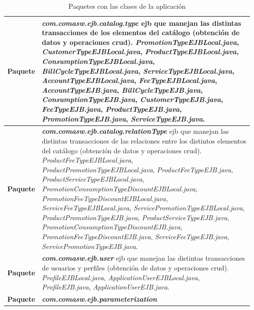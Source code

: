 \begin{longtable}{m{1cm} m{11cm}}
    \caption{Paquetes con las clases de la aplicación}
    \label{tab:paquetes}\\
    \rowcolors{2}{white}{white}
    \textbf{Paquete} & \textit{\textbf{com.comasw.ejb.catalog.type}} \newline
    \acrshort{ejb} que manejan las distintas transacciones de los elementos del catálogo (obtención de datos y operaciones \acrshort{crud}).\newline
\textit{PromotionTypeEJBLocal.java},
\textit{CustomerTypeEJBLocal.java},
\textit{ProductTypeEJBLocal.java},
\textit{ConsumptionTypeEJBLocal.java},
\textit{BillCycleTypeEJBLocal.java},
\textit{ServiceTypeEJBLocal.java},
\textit{AccountTypeEJBLocal.java},
\textit{FeeTypeEJBLocal.java},
\textit{AccountTypeEJB.java},
\textit{BillCycleTypeEJB.java},
\textit{ConsumptionTypeEJB.java},
\textit{CustomerTypeEJB.java},
\textit{FeeTypeEJB.java},
\textit{ProductTypeEJB.java},
\textit{PromotionTypeEJB.java},
\textit{ServiceTypeEJB.java}.
    \\\hline
    \textbf{Paquete} & \textit{\textbf{com.comasw.ejb.catalog.relationType}} \newline
     \acrshort{ejb} que manejan las distintas transacciones de las relaciones entre los distintos elementos del catálogo (obtención de datos y operaciones \acrshort{crud}).\newline
\textit{ProductFeeTypeEJBLocal.java},
\textit{ProductPromotionTypeEJBLocal.java},
\textit{ProductFeeTypeEJB.java},
\textit{ProductServiceTypeEJBLocal.java},
\textit{PromotionConsumptionTypeDiscountEJBLocal.java},
\textit{PromotionFeeTypeDiscountEJBLocal.java},
\textit{ServiceFeeTypeEJBLocal.java},
\textit{ServicePromotionTypeEJBLocal.java},
\textit{ProductPromotionTypeEJB.java},
\textit{ProductServiceTypeEJB.java},
\textit{PromotionConsumptionTypeDiscountEJB.java},
\textit{PromotionFeeTypeDiscountEJB.java},
\textit{ServiceFeeTypeEJB.java},
\textit{ServicePromotionTypeEJB.java}.
	\\\hline
	\textbf{Paquete} & \textit{\textbf{com.comasw.ejb.user}} \newline
     \acrshort{ejb} que manejan las distintas transacciones de usuarios y perfiles (obtención de datos y operaciones \acrshort{crud}).\newline
\textit{ProfileEJBLocal.java},
\textit{ApplicationUserEJBLocal.java},
\textit{ProfileEJB.java},
\textit{ApplicationUserEJB.java}.
	\\\hline
	\textbf{Paquete} & \textit{\textbf{com.comasw.ejb.parameterization}} \newline

\end{longtable}
